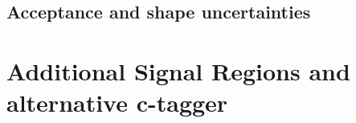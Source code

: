 \subsection {Acceptance and shape uncertainties}

\clearpage
\section {Additional Signal Regions and alternative c-tagger}
\clearpage

